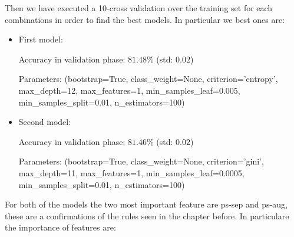 \medskip

Then we have executed a 10-cross validation over the training set for each combinations in order to find the best models.
In particular we best ones are:

\medskip

\begin{itemize}
  \item First model:
  
  Accuracy in validation phase: $81.48\%$ (std: $0.02$)
  
  Parameters: (bootstrap=True, class\_weight=None, criterion='entropy',
            max\_depth=12, max\_features=1, min\_samples\_leaf=0.005, min\_samples\_split=0.01, n\_estimators=100)
            
  \item Second model:
  
  Accuracy in validation phase: $81.46\%$ (std: $0.02$)

  Parameters: (bootstrap=True, class\_weight=None, criterion='gini',
            max\_depth=11, max\_features=1, min\_samples\_leaf=0.0005, min\_samples\_split=0.01, n\_estimators=100)

\end{itemize}

\medskip

For both of the models the two most important feature are ps-sep and ps-aug, these are a confirmations of the rules seen in the chapter before. In particulare the importance of features are:

\medskip

